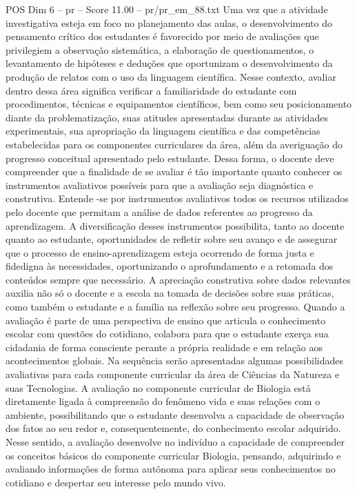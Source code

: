\begin{textsample}{POS Dim 6 – pr – Score 11.00 – pr/pr\_em\_88.txt}
Uma vez que a atividade investigativa esteja em foco no planejamento das aulas, o desenvolvimento do pensamento crítico dos estudantes é favorecido por meio de avaliações que privilegiem a observação sistemática, a elaboração de questionamentos, o levantamento de hipóteses e deduções que oportunizam o desenvolvimento da produção de relatos com o uso da linguagem científica.
Nesse contexto, avaliar dentro dessa área significa verificar a familiaridade do estudante com procedimentos, técnicas e equipamentos científicos, bem como seu posicionamento diante da problematização, suas atitudes apresentadas durante as atividades experimentais, sua apropriação da linguagem científica e das competências estabelecidas para os componentes curriculares da área, além da averiguação do progresso conceitual apresentado pelo estudante.
Dessa forma, o docente deve compreender que a finalidade de se avaliar é tão importante quanto conhecer os instrumentos avaliativos possíveis para que a avaliação seja diagnóstica e construtiva.
Entende -se por instrumentos avaliativos todos os recursos utilizados pelo docente que permitam a análise de dados referentes ao progresso da aprendizagem.
A diversificação desses instrumentos possibilita, tanto ao docente quanto ao estudante, oportunidades de refletir sobre seu avanço e de assegurar que o processo de ensino-aprendizagem esteja ocorrendo de forma justa e fidedigna às necessidades, oportunizando o aprofundamento e a retomada dos conteúdos sempre que necessário.
A apreciação construtiva sobre dados relevantes auxilia não só o docente e a escola na tomada de decisões sobre suas práticas, como também o estudante e a família na reflexão sobre seu progresso.
Quando a avaliação é parte de uma perspectiva de ensino que articula o conhecimento escolar com questões do cotidiano, colabora para que o estudante exerça sua cidadania de forma consciente perante a própria realidade e em relação aos acontecimentos globais.
Na sequência serão apresentadas algumas possibilidades avaliativas para cada componente curricular da área de Ciências da Natureza e suas Tecnologias.
A avaliação no componente curricular de Biologia está diretamente ligada à compreensão do fenômeno vida e suas relações com o ambiente, possibilitando que o estudante desenvolva a capacidade de observação dos fatos ao seu redor e, consequentemente, do conhecimento escolar adquirido.
Nesse sentido, a avaliação desenvolve no indivíduo a capacidade de compreender os conceitos básicos do componente curricular Biologia, pensando, adquirindo e avaliando informações de forma autônoma para aplicar seus conhecimentos no cotidiano e despertar seu interesse pelo mundo vivo.

\end{textsample}
